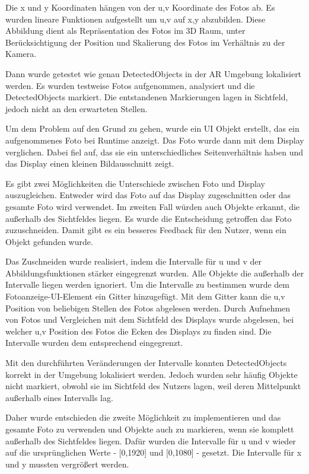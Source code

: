 \documentclass[german,a4paper, 12pt]{llncs}
\begin{document}
Die x und y Koordinaten hängen von der u,v Koordinate des Fotos ab. Es wurden lineare Funktionen aufgestellt um u,v auf x,y abzubilden. Diese Abbildung dient als Repräsentation des Fotos im 3D Raum, unter Berücksichtigung der Position und Skalierung des Fotos im Verhältnis zu der Kamera.

Dann wurde getestet wie genau DetectedObjects in der AR Umgebung lokalisiert werden. Es wurden testweise Fotos aufgenommen, analysiert und die DetectedObjects markiert. Die entstandenen Markierungen lagen in Sichtfeld, jedoch nicht an den erwarteten Stellen. 

Um dem Problem auf den Grund zu gehen, wurde ein UI Objekt erstellt, das ein aufgenommenes Foto bei Runtime anzeigt.
Das Foto wurde dann mit dem Display verglichen. Dabei fiel auf, das sie ein unterschiedliches Seitenverhältnis haben und das Display einen kleinen Bildausschnitt zeigt.  

Es gibt zwei Möglichkeiten die Unterschiede zwischen Foto und Display auszugleichen. Entweder wird das Foto auf das Display zugeschnitten oder das gesamte Foto wird verwendet. Im zweiten Fall würden auch Objekte erkannt, die außerhalb des Sichtfeldes liegen.
Es wurde die Entscheidung getroffen das Foto zuzuschneiden. Damit gibt es ein besseres Feedback für den Nutzer, wenn ein Objekt gefunden wurde. 

Das Zuschneiden wurde realisiert, indem die Intervalle für u und v der Abbildungsfunktionen stärker eingegrenzt wurden. Alle Objekte die außerhalb der Intervalle liegen werden ignoriert. Um die Intervalle zu bestimmen wurde dem Fotoanzeige-UI-Element ein Gitter hinzugefügt. Mit dem Gitter kann die u,v Position von beliebigen Stellen des Fotos abgelesen werden. 
Durch Aufnehmen von Fotos und Vergleichen mit dem Sichtfeld des Displays wurde abgelesen, bei welcher u,v Position des Fotos die Ecken des Displays zu finden sind. Die Intervalle wurden dem entsprechend eingegrenzt. 

Mit den durchführten Veränderungen der Intervalle konnten DetectedObjects korrekt in der Umgebung lokalisiert werden. Jedoch wurden sehr häufig Objekte nicht markiert, obwohl sie im Sichtfeld des Nutzers lagen, weil deren Mittelpunkt außerhalb eines Intervalls lag.

Daher wurde entschieden die zweite Möglichkeit zu implementieren und das gesamte Foto zu verwenden und Objekte auch zu markieren, wenn sie komplett außerhalb des Sichtfeldes liegen. 
Dafür wurden die Intervalle für u und v wieder auf die ursprünglichen Werte - [0,1920] und [0,1080] - gesetzt. Die Intervalle für x und y mussten vergrößert werden.
\end{document}

